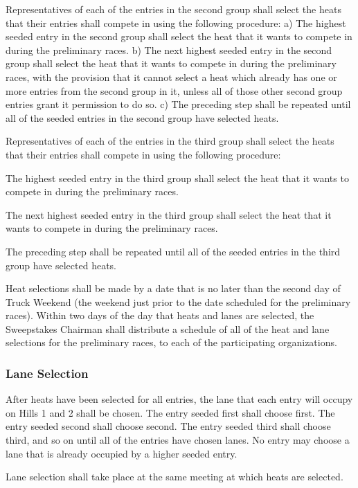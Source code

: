 	Representatives of each of the entries in the second group shall select the
	heats that their entries shall compete in using the following procedure: a) The
	highest seeded entry in the second group shall select the heat that it wants to
	compete in during the preliminary races. b) The next highest seeded entry in
	the second group shall select the heat that it wants to compete in during the
	preliminary races, with the provision that it cannot select a heat which
	already has one or more entries from the second group in it, unless all of
	those other second group entries grant it permission to do so. c) The preceding
	step shall be repeated until all of the seeded entries in the second group have
	selected heats.

	Representatives of each of the entries in the third group shall select the
	heats that their entries shall compete in using the following procedure:

	The highest seeded entry in the third group shall select the heat that it wants
	to compete in during the preliminary races.

	The next highest seeded entry in the third group shall select the heat that it
	wants to compete in during the preliminary races.

	The preceding step shall be repeated until all of the seeded entries in the
	third group have selected heats.

	Heat selections shall be made by a date that is no later than the second day of
	Truck Weekend (the weekend just prior to the date scheduled for the preliminary
	races). Within two days of the day that heats and lanes are selected, the
	Sweepstakes Chairman shall distribute a schedule of all of the heat and lane
	selections for the preliminary races, to each of the participating
	organizations.

\subsubsection{Lane Selection}

	After heats have been selected for all entries, the lane that each entry will
	occupy on Hills 1 and 2 shall be chosen. The entry seeded first shall choose
	first. The entry seeded second shall choose second. The entry seeded third
	shall choose third, and so on until all of the entries have chosen lanes. No
	entry may choose a lane that is already occupied by a higher seeded entry.

	Lane selection shall take place at the same meeting at which heats are
	selected.

